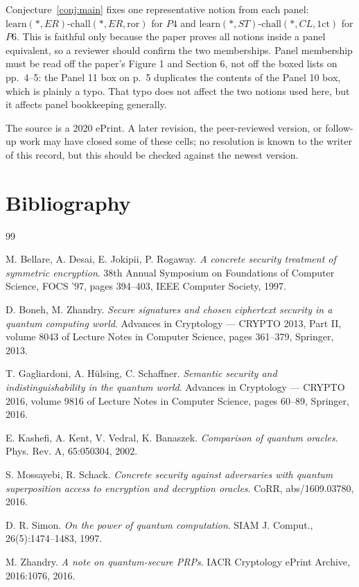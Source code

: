 \documentclass{aicr-conjecture}
\newcommand{\ror}{\mathrm{ror}}
\newcommand{\onect}{1\mathrm{ct}}
\newcommand{\learn}{\mathrm{learn}}
\newcommand{\chall}{\mathrm{chall}}
\newcommand{\NERror}{\ensuremath{\learn(*,ER)}-\ensuremath{\chall(*,ER,\ror)}}
\newcommand{\NBZ}{\ensuremath{\learn(*,ST)}-\ensuremath{\chall(*,CL,\onect)}}
\begin{document}
\begin{remark}\label{rem:panels}
Conjecture~\ref{conj:main} fixes one representative notion from each
panel: \NERror{} for $P4$ and \NBZ{} for $P6$. This is faithful only
because the paper proves all notions inside a panel equivalent, so a
reviewer should confirm the two memberships. Panel membership must be
read off the paper's Figure 1 and Section 6, not off the boxed lists on
pp.~4--5: the Panel 11 box on p.~5 duplicates the contents of the Panel
10 box, which is plainly a typo. That typo does not affect the two
notions used here, but it affects panel bookkeeping generally.
\end{remark}

\begin{remark}\label{rem:currency}
The source is a 2020 ePrint. A later revision, the peer-reviewed
version, or follow-up work may have closed some of these cells; no
resolution is known to the writer of this record, but this should be
checked against the newest version.
\end{remark}

\section{Bibliography}

\begin{aicrbibliography}{99}

M. Bellare, A. Desai, E. Jokipii, P. Rogaway.
\emph{A concrete security treatment of symmetric encryption}.
38th Annual Symposium on Foundations of Computer Science, FOCS '97,
pages 394--403, IEEE Computer Society, 1997.

D. Boneh, M. Zhandry.
\emph{Secure signatures and chosen ciphertext security in a quantum
computing world}.
Advances in Cryptology --- CRYPTO 2013, Part II, volume 8043 of Lecture
Notes in Computer Science, pages 361--379, Springer, 2013.

T. Gagliardoni, A. H\"ulsing, C. Schaffner.
\emph{Semantic security and indistinguishability in the quantum world}.
Advances in Cryptology --- CRYPTO 2016, volume 9816 of Lecture Notes in
Computer Science, pages 60--89, Springer, 2016.

E. Kashefi, A. Kent, V. Vedral, K. Banaszek.
\emph{Comparison of quantum oracles}.
Phys. Rev. A, 65:050304, 2002.

S. Mossayebi, R. Schack.
\emph{Concrete security against adversaries with quantum superposition
access to encryption and decryption oracles}.
CoRR, abs/1609.03780, 2016.

D. R. Simon.
\emph{On the power of quantum computation}.
SIAM J. Comput., 26(5):1474--1483, 1997.

M. Zhandry.
\emph{A note on quantum-secure PRPs}.
IACR Cryptology ePrint Archive, 2016:1076, 2016.

\end{aicrbibliography}
\end{document}
